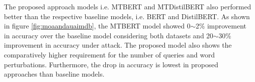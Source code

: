 \documentclass[%
	BCOR=8mm, %
	DIV=12,
	toc=bibliography, %
	toc=listof, %
	oneside, %
	egregdoesnotlikesansseriftitles, %
	]{scrbook}
\begin{document}
The proposed approach models i.e. MTBERT and MTDistilBERT also performed better than the respective baseline models, i.e. BERT and DistilBERT.  As shown in figure \ref{fig:moaandauaimdb}, the MTBERT model showed 0$\sim$2\% improvement in accuracy over the baseline model considering both datasets and 20$\sim$30\% improvement in accuracy under attack. The proposed model also shows the comparatively higher requirement for the number of queries and word perturbations. Furthermore, the drop in accuracy is lowest in proposed approaches than baseline models.
\end{document}
